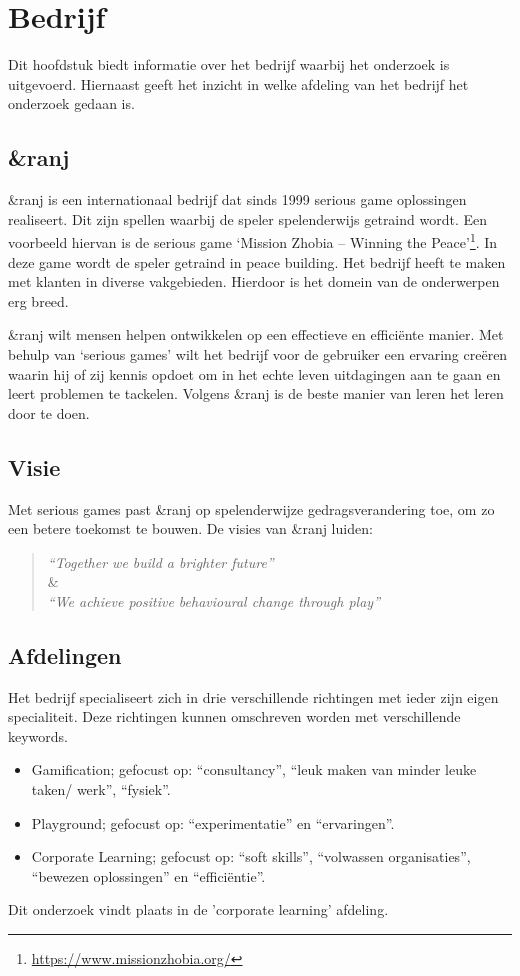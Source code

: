 \chapter{Bedrijf}
\label{ch:bedrijf}
Dit hoofdstuk biedt informatie over het bedrijf waarbij het onderzoek is uitgevoerd. Hiernaast geeft het inzicht in welke afdeling van het bedrijf het onderzoek gedaan is. 

\section{\&ranj}
\&ranj is een internationaal bedrijf dat sinds 1999 serious game oplossingen realiseert. Dit zijn spellen waarbij de speler spelenderwijs getraind wordt. Een voorbeeld hiervan is de serious game ‘Mission Zhobia – Winning the Peace’\footnote{\url{https://www.missionzhobia.org/}}. In deze game wordt de speler getraind in peace building. Het bedrijf heeft te maken met klanten in diverse vakgebieden. Hierdoor is het domein van de onderwerpen erg breed.

\&ranj wilt mensen helpen ontwikkelen op een effectieve en efficiënte manier. Met behulp van ‘serious games’ wilt het bedrijf voor de gebruiker een ervaring creëren waarin hij of zij kennis opdoet om in het echte leven uitdagingen aan te gaan en leert problemen te tackelen. Volgens \&ranj is de beste manier van leren het leren door te doen.

\section{Visie}
Met serious games past \&ranj op spelenderwijze gedragsverandering toe, om zo een betere toekomst te bouwen. De visies van \&ranj luiden:

\begin{quote} 
    \centering
    \large
    \textit{
        “Together we build a brighter future”
    }\\
    \&\\
    \textit{
        “We achieve positive behavioural change through play”
    }
\end{quote}

\pagebreak
\section{Afdelingen}
\label{sec:afdelingen}
Het bedrijf specialiseert zich in drie verschillende richtingen met ieder zijn eigen specialiteit. Deze richtingen kunnen omschreven worden met verschillende keywords.
\begin{itemize}
    \item Gamification; gefocust op: “consultancy”, “leuk maken van minder leuke taken/ werk”, “fysiek”.
    \item Playground; gefocust op: “experimentatie” en “ervaringen”.
    \item Corporate Learning; gefocust op: “soft skills”, “volwassen organisaties”, “bewezen oplossingen” en “efficiëntie”.
\end{itemize}
Dit onderzoek vindt plaats in de 'corporate learning’ afdeling.

